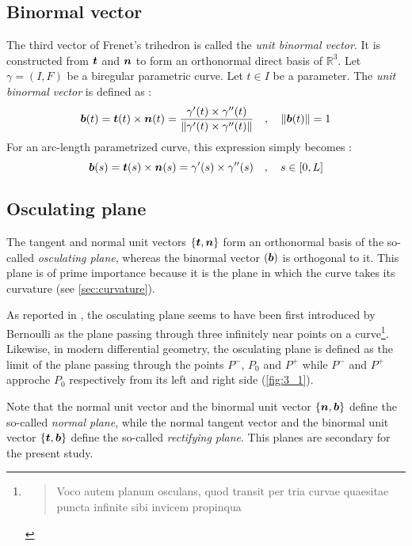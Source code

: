 \subsection{Binormal vector}
The third vector of Frenet's trihedron is called the \emph{unit binormal vector}. It is constructed from $\boldsymbol{t}$ and $\boldsymbol{n}$ to form an orthonormal direct basis of $\mathbb{R}^{3}$. 
Let $\gamma = (I,F)$ be a biregular parametric curve. Let $t \in I$ be a parameter. The \emph{unit binormal vector} is defined as :
\begin{equation}
	\boldsymbol{b}(t) = \boldsymbol{t}(t) \times \boldsymbol{n}(t)
	= \frac{\gamma'(t) \times \gamma''(t)}{\|\gamma'(t) \times \gamma''(t)\|}
	\quad,\quad
	\|\boldsymbol{b}(t)\|=1
\end{equation}
For an arc-length parametrized curve, this expression simply becomes :
\begin{equation}
	\boldsymbol{b}(s) = \boldsymbol{t}(s) \times \boldsymbol{n}(s)
	= \gamma'(s) \times \gamma''(s)
	\quad,\quad
	s \in [0,L]
\end{equation}

\subsection{Osculating plane}\label{sec:osculatingplane}
The tangent and normal unit vectors $\{\boldsymbol{t},\boldsymbol{n}\}$ form an orthonormal basis of the so-called \emph{osculating plane}, whereas the binormal vector $(\boldsymbol{b})$ is orthogonal to it. This plane is of prime importance because it is the plane in which the curve takes its curvature (see \cref{sec:curvature}).

As reported in \cite[p.45]{Delcourt2007}, the osculating plane seems to have been first introduced by Bernoulli as the plane passing through three infinitely near points on a curve\footnote{
\blockcquote[p.113]{Bernoulli1728}{Voco autem planum osculans, quod transit per tria curvae quaesitae puncta infinite sibi invicem propinqua}.
}. Likewise, in modern differential geometry, the osculating plane is defined as the limit of the plane passing through the points $P^-$, $P_0$ and $P^+$ while $P^-$ and $P^+$ approche $P_0$ respectively from its left and right side (\cref{fig:3_1}).

Note that the normal unit vector and the binormal unit vector $\{\boldsymbol{n},\boldsymbol{b}\}$ define the so-called \emph{normal plane}, while the normal tangent vector and the binormal unit vector $\{\boldsymbol{t},\boldsymbol{b}\}$ define the so-called \emph{rectifying plane}. This planes are secondary for the present study.

